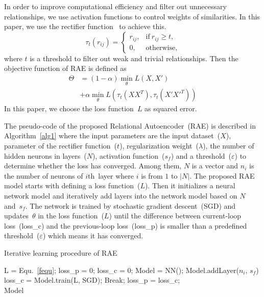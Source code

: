 \documentclass[conference]{IEEEtran}
\begin{document}
	In order to improve computational efficiency and filter out unnecessary relationships, we use activation functions to control weights of similarities. In this paper, we use the rectifier function~\cite{lecun2015deep} to achieve this.
	\begin{equation}
	\tau_{t}(r_{ij}) =
	\begin{cases}
	r_{ij}, & \text{if}\ r_{ij} \geq t,  \\
	0,      & \text{otherwise},
	\end{cases}
	\end{equation}
	where $t$ is a threshold to filter out weak and trivial relationships. Then the objective function of RAE is defined as
	\begin{equation}
	\label{fequ}
	\begin{split}
	\Theta &= (1-\alpha)\min_{\theta} L(X, X') \\
	& + \alpha\min_{\theta}L(\tau_{t}(XX^{T}), \tau_{t}(X'X'^{T}))
	\end{split}
	\end{equation}
	In this paper, we choose the loss function~$L$ as squared error.
	
	The pseudo-code of the proposed Relational Autoencoder~(RAE) is described in Algorithm~\ref{alg1} where the input parameters are the input dataset~($X$), parameter of the rectifier function~($t$), regularization weight~($\lambda$), the number of hidden neurons in layers~($N$), activation function~($s_{f}$) and a threshold~($\varepsilon$) to determine whether the loss has converged. Among them, $N$ is a vector and $n_{i}$ is the number of neurons of $i$th~layer where $i$ is from $1$ to $|N|$. The proposed RAE model starts with defining a loss function~($L$). Then it initializes a neural network model and iteratively add layers into the network model based on $N$ and~$s_{f}$. The network is trained by stochastic gradient descent~(SGD) and updates~$\theta$ in the loss function~($L$) until the difference between current-loop loss~(loss\_c) and the previous-loop loss~(loss\_p) is smaller than a predefined threshold~($\varepsilon$) which means it has converged.
	
	\begin{algorithm}[t]
		\caption{Iterative learning procedure of RAE}
		\label{alg1}
		\begin{algorithmic}[1]
				\State L = Equ.~\ref{fequ};
				\State loss\_p = 0;
				\State loss\_c = 0;
				\State Model = NN();  
					\State Model.addLayer($n_{i}$, $s_{f}$)
				\EndFor
					\State loss\_c = Model.train(L, SGD);
						\State Break;
					\Else
						\State loss\_p = loss\_c;	
					\EndIf
				\EndWhile \\
				\Return Model
			\EndFunction
		\end{algorithmic}
	\end{algorithm}
	
\end{document}
